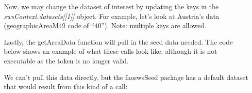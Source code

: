 \documentclass[nojss]{jss}
\begin{document}
Now, we may change the dataset of interest by updating the keys in the
\textit{swsContext.datasets[[1]]} object.  For example, let's look at Austria's
data (geographicAreaM49 code of ``40'').  Note: multiple keys are allowed.

Lastly, the getAreaData function will pull in the seed data needed.  The code
below shows an example of what these calls look like, although it is not
executable as the token is no longer valid.

\begin{Schunk}
\end{Schunk}

We can't pull this data directly, but the faoswsSeed package has a default
dataset that would result from this kind of a call:
\end{document}
